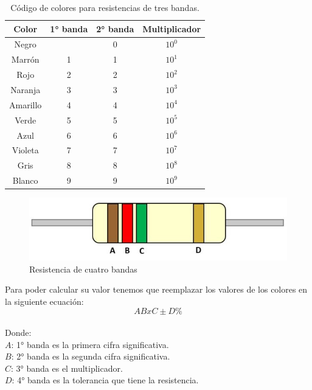 \begin{table}[h]
	\begin{center}
		\begin{tabular}{|c | c | c | c |}
			\hline
			Color& 1° banda & 2° banda & Multiplicador \\
			 \hline
			Negro&& 0 &$ 10^{0}$ \\
			\hline
			Marrón & 1&1&$ 10^{1}$\\
			\hline
			Rojo & 2&2&$ 10^{2}$\\
			\hline
			Naranja & 3&3&$ 10^{3}$\\
			\hline
			Amarillo & 4&4&$ 10^{4}$\\
			\hline
			Verde & 5&5&$ 10^{5}$\\
			\hline
			Azul & 6&6&$ 10^{6}$\\
			\hline
			Violeta & 7&7&$ 10^{7}$\\
			\hline
			Gris & 8&8&$ 10^{8}$\\
			\hline
			Blanco & 9&9&$ 10^{9}$\\
			\hline
		\end{tabular}
		\caption{Código de colores para resistencias de tres bandas.}
	\end{center}
\end{table}
\begin{figure}[h]
	\centering 
	\includegraphics[width=15cm]{imagenes/cuatrobandas}
	\caption{Resistencia de cuatro bandas}
\end{figure}
Para poder calcular su valor tenemos que reemplazar los valores de los colores en la siguiente ecuación:\\
\begin{equation*}
	ABxC \pm D\%
\end{equation*}\\
Donde: \\
$ A $: 1° banda es la primera cifra significativa.\\
$ B $: 2° banda es la segunda cifra significativa.\\
$ C $: 3° banda es el multiplicador.\\
$D$: 4° banda es la tolerancia que tiene la resistencia.\\
